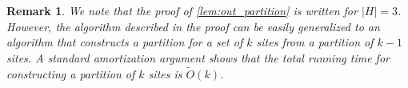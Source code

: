 \documentclass{article}
\newtheorem{remark}{Remark}
\newcommand{\Otild}{\tilde{O}}
\begin{document}
\begin{remark}\label{remark:linear_time_partition}
    We note that the proof of \cref{lem:out_partition} is written for $|H|=3$.
    However, the algorithm described in the proof can be easily generalized to an  algorithm that constructs a partition for a set of $k$ sites from a partition of $k-1$ sites.
    A standard amortization argument shows that the total running time for constructing a partition of $k$ sites is $\Otild(k)$.
\end{remark}
\end{document}
